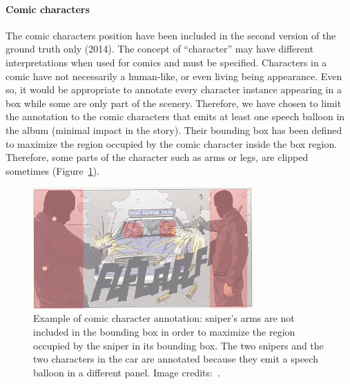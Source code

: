 
\paragraph{Comic characters} %
\label{par:comic_characters}
The comic characters position have been included in the second version of the ground truth only (2014).
The concept of ``character'' may have different interpretations when used for comics and must be specified.
Characters in a comic have not necessarily a human-like, or even living being appearance.
Even so, it would be appropriate to annotate every character instance appearing in a box while some are only part of the scenery.
Therefore, we have chosen to limit the annotation to the comic characters that emits at least one speech balloon in the album (minimal impact in the story).
Their bounding box has been defined to maximize the region occupied by the comic character inside the box region.
Therefore, some parts of the character such as arms or legs, are clipped sometimes (Figure~\ref{fig:gt:segCharacter}).

\begin{figure}[h!]
\begin{center}
\includegraphics[width=0.75\textwidth]{segCharacter.png}
\caption[Comic character position annotation]{Example of comic character annotation: sniper's arms are not included in the bounding box in order to maximize the region occupied by the sniper in its bounding box. The two snipers and the two characters in the car are annotated because they emit a speech balloon in a different panel. Image credits:~\cite{Boston10}.}
\label{fig:gt:segCharacter}
\end{center}
\end{figure}




